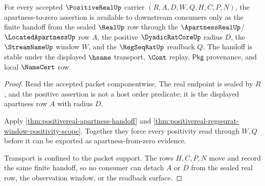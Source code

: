 \begin{theorem}
\label{thm:positive-real-apartness-handoff}
For every accepted $\PositiveRealUp$ carrier $(R,A,D,W,Q,H,C,P,N)$, the
apartness-to-zero assertion is available to downstream consumers only as the
finite handoff from the sealed $\RealUp$ row through the
$\ApartnessRealUp$/$\LocatedApartnessUp$ row $A$, the positive
$\DyadicRatCoreUp$ radius $D$, the $\StreamNameUp$ window $W$, and the
$\RegSeqRatUp$ readback $Q$. The handoff is stable under the displayed
$\hsame$ transport, $\Cont$ replay, $\mathsf{Pkg}$ provenance, and local
$\NameCert$ row.
\end{theorem}
\begin{proof}
Read the accepted packet componentwise. The real endpoint is sealed by $R$,
and the positive assertion is not a host order predicate; it is the displayed
apartness row $A$ with radius $D$.

Apply \autoref{thm:positivereal-apartness-handoff} and
\autoref{thm:positivereal-regseqrat-window-positivity-scope}. Together they
force every positivity read through $W,Q$ before it can be exported as
apartness-from-zero evidence.

Transport is confined to the packet support. The rows $H,C,P,N$ move and
record the same finite handoff, so no consumer can detach $A$ or $D$ from the
sealed real row, the observation window, or the readback surface.
\end{proof}

